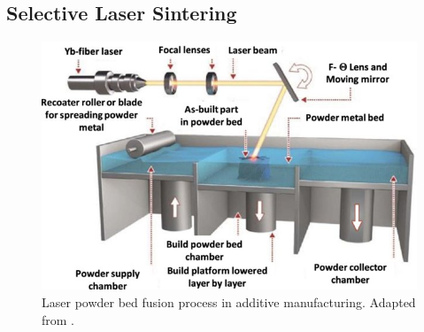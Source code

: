 \subsection{Selective Laser Sintering}
\label{subsec:LPBF}
\begin{figure}
    \centering
    \includegraphics[scale=1.1]{Images/PBF.jpg}
    \caption[Laser PBF in AM.]{Laser powder bed fusion process in additive manufacturing. Adapted from \cite{ozel_focus_2020}.}
    \label{fig:PBF}
\end{figure}
